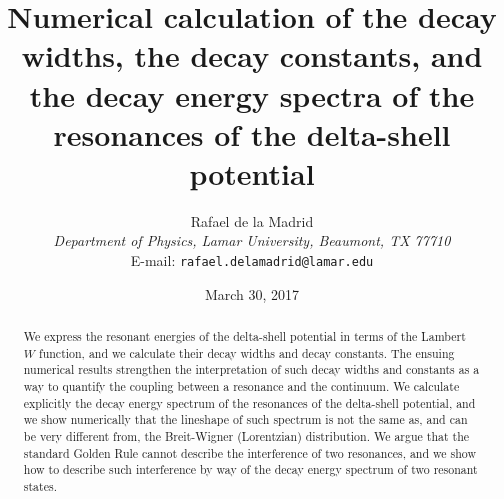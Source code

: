 \documentclass[12pt]{article}
\begin{document}
\title{\bf Numerical calculation of the decay widths, the decay constants, 
and the decay energy spectra of the resonances of the delta-shell potential}




\author{Rafael de la Madrid \\
\small{\it Department of Physics, Lamar University,
Beaumont, TX 77710} \\
\small{E-mail: \texttt{rafael.delamadrid@lamar.edu}}}




\date{\small{March 30, 2017}}


















\maketitle

\begin{abstract}
\noindent
We express the resonant energies of the delta-shell potential
in terms of the Lambert $W$ function, and we calculate their decay widths and
decay constants. The ensuing numerical results strengthen the interpretation of
such decay widths and constants as a way to quantify the coupling 
between a resonance and the continuum. We calculate 
explicitly the decay energy spectrum of the resonances of the delta-shell 
potential, and we show numerically that the lineshape of such spectrum
is not the same as, and can be very different
from, the Breit-Wigner (Lorentzian) distribution. We argue that
the standard Golden Rule cannot describe the interference of two 
resonances, and we show how to describe such interference by way of the
decay energy spectrum of two resonant states.
\end{abstract}
\end{document}
